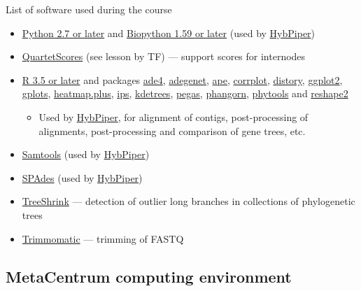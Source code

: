 \documentclass[compress, ucs, xelatex, 11pt, xcolor=x11names, aspectratio=169,
	hyperref={
		bookmarks=true,
		unicode=true,
		colorlinks=true,
		pdftitle={HybSeq course},
		plainpages=false,
		pdfauthor={Vojtech Zeisek},
		pdfsubject={Practical processing of HybSeq target enrichment sequencing data on computing grids like MetaCentrum},
		pdfcreator={XeLaTeX},
		pdfkeywords={BASH, command line, GNU, HybSeq, Linux, MetaCentrum, sequencing shell, target enrichment},
		linkcolor=Cyan2, %
		anchorcolor=Firebrick2, %
		citecolor=Firebrick2, %
		filecolor=Firebrick2, %
		menucolor=Firebrick2, %
		urlcolor=Chartreuse2, %
		pdftex},
	url={hyphens, lowtilde} %
	]{beamer}
\begin{document}
\begin{frame}[allowframebreaks]{List of software used during the course}
\begin{itemize}
		\item \href{https://www.python.org/}{Python 2.7 or later} and \href{https://biopython.org/}{Biopython 1.59 or later} (used by \href{https://github.com/mossmatters/HybPiper/wiki}{HybPiper})
		\item \href{https://github.com/lutteropp/QuartetScores}{QuartetScores} (see lesson by TF) --- support scores for internodes
		\item \href{https://www.r-project.org/}{R 3.5 or later} and packages \href{https://cran.r-project.org/package=ade4}{ade4}, \href{https://cran.r-project.org/package=adegenet}{adegenet}, \href{https://cran.r-project.org/package=ape}{ape}, \href{https://cran.r-project.org/package=corrplot}{corrplot}, \href{https://cran.r-project.org/package=distory}{distory}, \href{https://cran.r-project.org/package=ggplot2}{ggplot2}, \href{https://cran.r-project.org/package=gplots}{gplots}, \href{https://cran.r-project.org/package=heatmap.plus}{heatmap.plus}, \href{https://cran.r-project.org/package=ips}{ips}, \href{https://cran.r-project.org/package=kdetrees}{kdetrees}, \href{https://cran.r-project.org/package=pegas}{pegas}, \href{https://cran.r-project.org/package=phangorn}{phangorn}, \href{https://cran.r-project.org/package=phytools}{phytools} and \href{https://cran.r-project.org/package=reshape2}{reshape2}
		\begin{itemize}
			\item Used by \href{https://github.com/mossmatters/HybPiper/wiki}{HybPiper}, for alignment of contigs, post-processing of alignments, post-processing and comparison of gene trees, etc.
		\end{itemize}
		\item \href{https://github.com/samtools/samtools}{Samtools} (used by \href{https://github.com/mossmatters/HybPiper/wiki}{HybPiper})
		\item \href{https://github.com/ablab/spades}{SPAdes} (used by \href{https://github.com/mossmatters/HybPiper/wiki}{HybPiper})
		\item \href{https://github.com/uym2/TreeShrink}{TreeShrink} --- detection of outlier long branches in collections of phylogenetic trees
		\item \href{http://www.usadellab.org/cms/?page=trimmomatic}{Trimmomatic} --- trimming of FASTQ
	\end{itemize}
\end{frame}

\subsection{MetaCentrum computing environment}
\end{document}
